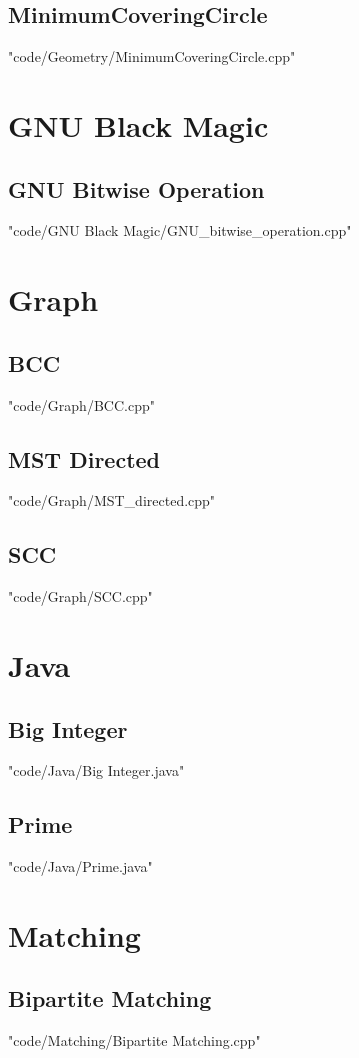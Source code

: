 \documentclass [landscape,8pt,a4paper,twocolumn]{article}
\begin{document}
\subsection{MinimumCoveringCircle}
 {"code/Geometry/MinimumCoveringCircle.cpp"}
\section{GNU Black Magic}
\subsection{GNU Bitwise Operation}
 {"code/GNU Black Magic/GNU_bitwise_operation.cpp"}
\section{Graph}
\subsection{BCC}
 {"code/Graph/BCC.cpp"}
\subsection{MST Directed}
 {"code/Graph/MST_directed.cpp"}
\subsection{SCC}
 {"code/Graph/SCC.cpp"}
\section{Java}
\subsection{Big Integer}
 {"code/Java/Big Integer.java"}
\subsection{Prime}
 {"code/Java/Prime.java"}
\section{Matching}
\subsection{Bipartite Matching}
 {"code/Matching/Bipartite Matching.cpp"}
\end{document}
